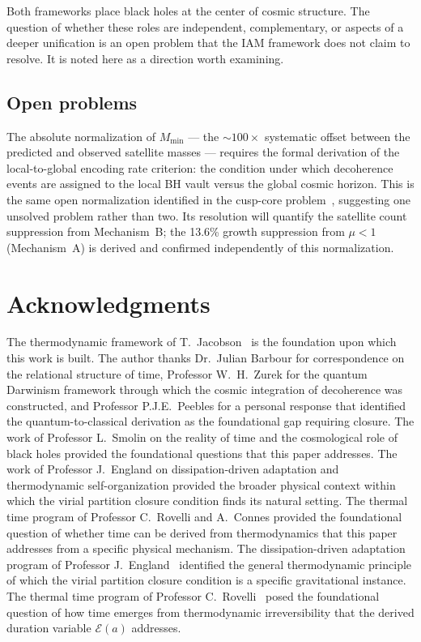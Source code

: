 \documentclass[12pt,a4paper]{article}
\begin{document}
Both frameworks place black holes at the center of cosmic structure.
The question of whether these roles are independent, complementary, or
aspects of a deeper unification is an open problem that the IAM framework
does not claim to resolve. It is noted here as a direction worth examining.

\subsection{Open problems}

The absolute normalization of $M_\mathrm{min}$ --- the $\sim 100\times$
systematic offset between the predicted and observed satellite masses ---
requires the formal derivation of the local-to-global encoding rate
criterion: the condition under which decoherence events are assigned to
the local BH vault versus the global cosmic horizon. This is the same
open normalization identified in the cusp-core problem~\citep{IAM_small_scale},
suggesting one unsolved problem rather than two. Its resolution will
quantify the satellite count suppression from Mechanism~B; the 13.6\%
growth suppression from $\mu < 1$ (Mechanism~A) is derived and confirmed
independently of this normalization.

\section*{Acknowledgments}

The thermodynamic framework of T.\ Jacobson~\citep{Jacobson1995} is
the foundation upon which this work is built. The author thanks
Dr.\ Julian Barbour for correspondence on the relational structure of time,
Professor W.\ H.\ Zurek for the quantum Darwinism framework through which
the cosmic integration of decoherence was constructed, and
Professor P.J.E.\ Peebles for a personal response that identified the
quantum-to-classical derivation as the foundational gap requiring closure.
The work of Professor L.\ Smolin on the reality of time and the
cosmological role of black holes provided the foundational questions that
this paper addresses. The work of Professor J.\ England on dissipation-driven
adaptation and thermodynamic self-organization provided the broader physical
context within which the virial partition closure condition finds its
natural setting. The thermal time program of Professor C.\ Rovelli and
A.\ Connes provided the foundational question of whether time can be derived
from thermodynamics that this paper addresses from a specific physical
mechanism. The dissipation-driven adaptation program of
Professor J.\ England~\citep{England2013,England2015} identified the
general thermodynamic principle of which the virial partition closure
condition is a specific gravitational instance. The thermal time program
of Professor C.\ Rovelli~\citep{Rovelli1993,Connes1994} posed the
foundational question of how time emerges from thermodynamic irreversibility
that the derived duration variable $\mathcal{E}(a)$ addresses.
\end{document}
